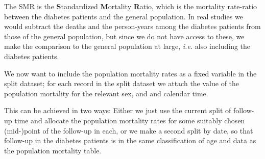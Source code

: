 


The SMR is the \textbf{S}tandardized \textbf{M}ortality
\textbf{R}atio, which is the mortality rate-ratio between the diabetes
patients and the general population.  In real studies we would
subtract the deaths and the person-years among the diabetes patients
from those of the general population, but since we do not have access
to these, we make the comparison to the general population at large,
\textit{i.e.} also including the diabetes patients.

We now want to include the population mortality rates as a fixed
variable in the split dataset; for each record in the split dataset we
attach the value of the population mortality for the relevant sex, and
and calendar time.

This can be achieved in two ways: Either we just use the current split
of follow-up time and allocate the population mortality rates for some
suitably chosen (mid-)point of the follow-up in each, or we make a
second split by date, so that follow-up in the diabetes patients is in
the same classification of age and data as the population mortality
table.

